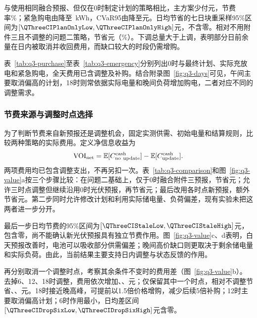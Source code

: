 与使用相同融合预报、但仅在0时制定计划的策略相比，主方案少付\QThreeSavingPlanOnly 元，节费率\QThreeSavingPlanOnlyPercent\%；紧急购电由\QThreePlanOnlyEmergency 降至\QThreeEmergencyEnergy\ kWh，CVaR95由\QThreePlanOnlyCvar 降至\QThreeCvar 元。日均节省的七日块重采样95\%区间为$[\QThreeCIPlanOnlyLow,\QThreeCIPlanOnlyHigh]$元，不含零。相对不用附件三且不调整的问题二策略，节省\QThreeSavingQTwo 元（\QThreeSavingQTwoPercent\%）。下调总量大于上调，表明部分日前余量在日内被取消并收回费用，而缺口较大的时段仍需增购。

表~\ref{tab:q3-purchase}至表~\ref{tab:q3-emergency}分别列出0时与最终计划、实际充放电和紧急购电，全天费用已含调整及补购。结合附录图~\ref{fig:q3-days}可见，午间主要取消偏高的计划，18时则常依据实际电量和晚间负荷增加购电，二者对应不同的调整需求。

\begingroup
\renewcommand{\arraystretch}{0.9}


\endgroup


\subsubsection{节费来源与调整时点选择}

为了判断节费来自新预报还是调整机会，固定实测供需、初始电量和结算规则，比较两种策略的实际费用。定义净信息收益为
\begin{equation}
  \operatorname{VOI}_{\rm net}
  =\mathbb E[C_{\rm no\ update}^{\rm cash}]
   -\mathbb E[C_{\rm update}^{\rm cash}].
  \label{eq:voi}
\end{equation}
两项费用均已包含调整支出，不再另扣一次。表~\ref{tab:q3-comparison}和图~\ref{fig:q3-value}a按三个步骤比较：在问题二基础上，仅于0时融合附件三预报，节省\QThreeValueExternalPlan 元；允许三时点调整但继续沿用0时光伏预报，再节省\QThreeValueAdjustNoInfo 元；最后改用各时点新预报，额外节省\QThreeValueFreshInfo 元。第二步同时允许修改计划和利用实际储电量、负荷偏差，现有实验未把这两者进一步分开。

最后一步日均节费的95\%区间为$[\QThreeCIStaleLow,\QThreeCIStaleHigh]$元，包含零，尚不能确认新光伏预报具有独立节费作用。图~\ref{fig:q3-value}c、d表明，白天预报改善时，电池可以吸收部分供需偏差；晚间高价缺口则更取决于剩余储电量和实际负荷。由此，当前结果主要支持日内调整与状态反馈的作用。



再分别取消一个调整时点，考察其余条件不变时的费用差（图~\ref{fig:q3-value}b）。去掉6、12、18时调整，费用依次增加\QThreeMarginalSix、\QThreeMarginalTwelve、\QThreeMarginalEighteen 元；仅保留其中一个时点，相对不调整节省\QThreeSingleSix、\QThreeSingleTwelve、\QThreeSingleEighteen 元。18时接近晚高峰，可提前以1.5倍价格增购，减少后续5倍补购；12时主要取消偏高计划；6时作用最小，日均差区间$[\QThreeCIDropSixLow,\QThreeCIDropSixHigh]$元含零。

